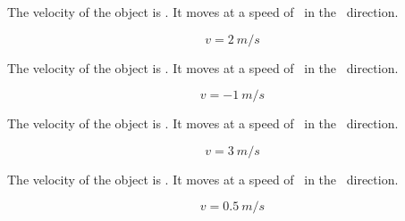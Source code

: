 \documentclass[]{exam}
\begin{document}
\begin{questions}
\begin{multicols}{2}

\question \label{hWlcS}
The velocity of the object is \fillin[][4em]. It moves at a speed of \fillin[][4em]\ in the \fillin[][4.5cm]\ direction.


\begin{solution}

\begin{equation*}
    v = \SI{2}{m/s}
\end{equation*}
\end{solution}

\question
The velocity of the object is \fillin[][4em]. It moves at a speed of \fillin[][4em]\ in the \fillin[][4.5cm]\ direction.


\begin{solution}

\begin{equation*}
    v = \SI{-1}{m/s}
\end{equation*}
\end{solution}

\ifprintanswers
\columnbreak
\fi

\question
The velocity of the object is \fillin[][4em]. It moves at a speed of \fillin[][4em]\ in the \fillin[][4.5cm]\ direction.


\begin{solution}

\begin{equation*}
    v = \SI{3}{m/s}
\end{equation*}
\end{solution}

\question
The velocity of the object is \fillin[][4em]. It moves at a speed of \fillin[][4em]\ in the \fillin[][4.5cm]\ direction.


\begin{solution}

\begin{equation*}
    v = \SI{0.5}{m/s}
\end{equation*}
\end{solution}

\ifprintanswers
\columnbreak
\fi


\end{multicols}
\end{questions}
\end{document}
